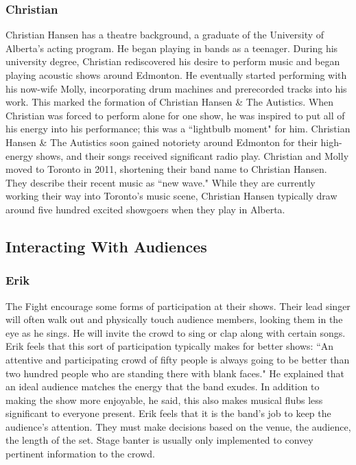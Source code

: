 \subsubsection{Christian}
Christian Hansen has a theatre background, a graduate of the University of Alberta's acting program. He began playing in bands as a teenager. During his university degree, Christian rediscovered his desire to perform music and began playing acoustic shows around Edmonton. He eventually started performing with his now-wife Molly, incorporating drum machines and prerecorded tracks into his work. This marked the formation of Christian Hansen \& The Autistics. When Christian was forced to perform alone for one show, he was inspired to put all of his energy into his performance; this was a ``lightbulb moment" for him. Christian Hansen \& The Autistics soon gained notoriety around Edmonton for their high-energy shows, and their songs received significant radio play. Christian and Molly moved to Toronto in 2011, shortening their band name to Christian Hansen. They describe their recent music as ``new wave." While they are currently working their way into Toronto's music scene, Christian Hansen typically draw around five hundred excited showgoers when they play in Alberta.

\subsection{Interacting With Audiences}

\subsubsection{Erik}
The Fight encourage some forms of participation at their shows. Their lead singer will often walk out and physically touch audience members, looking them in the eye as he sings. He will invite the crowd to sing or clap along with certain songs. Erik feels that this sort of participation typically makes for better shows: ``An attentive and participating crowd of fifty people is always going to be better than two hundred people who are standing there with blank faces." He explained that an ideal audience matches the energy that the band exudes. In addition to making the show more enjoyable, he said, this also makes musical flubs less significant to everyone present. Erik feels that it is the band's job to keep the audience's attention. They must make decisions based on the venue, the audience, the length of the set. Stage banter is usually only implemented to convey pertinent information to the crowd.

